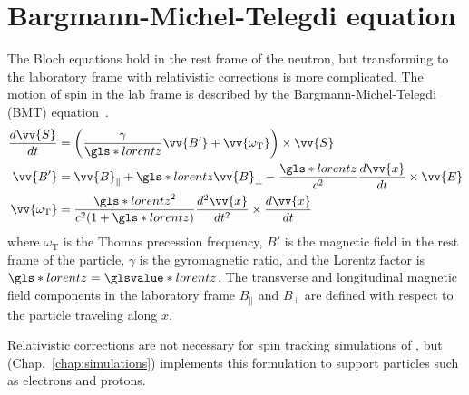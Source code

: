 
\section{Bargmann-Michel-Telegdi equation}\label{sec:BMT_equations}


The Bloch equations hold in the rest frame of the neutron, but transforming to the laboratory frame with relativistic corrections is more complicated. The motion of spin in the lab frame is described by the Bargmann-Michel-Telegdi (BMT) equation~\cite{bmt_equations}.
%
\begin{align}
    \frac{d\vv{S}}{dt} &= \left( \frac{\gamma}{\gls*{lorentz}}\vv{B'}+\vv{\omega_\text{T}}\right)\times \vv{S}\\
    \vv{B'} &= \vv{B}_\parallel + \gls*{lorentz}\vv{B}_\perp - \frac{\gls*{lorentz}}{c^2}\frac{d\vv{x}}{dt}\times\vv{E}\\
    \vv{\omega_\text{T}}&=\frac{\gls*{lorentz}^2}{c^2(1+\gls*{lorentz})}\frac{d^2\vv{x}}{dt^2}\times\frac{d\vv{x}}{dt}
\end{align}
%
where $\omega_\text{T}$ is the Thomas precession frequency, $B'$ is the magnetic field in the rest frame of the particle, $\gamma$ is the gyromagnetic ratio, and the Lorentz factor is $\gls*{lorentz}=\glsvalue*{lorentz}$. The transverse and longitudinal magnetic field components in the laboratory frame $B_\parallel$ and $B_\perp$ are defined with respect to the particle traveling along $x$.

Relativistic corrections are not necessary for spin tracking simulations of \ucn, but \pentrack (Chap.~\ref{chap:simulations}) implements this formulation to support particles such as electrons and protons.